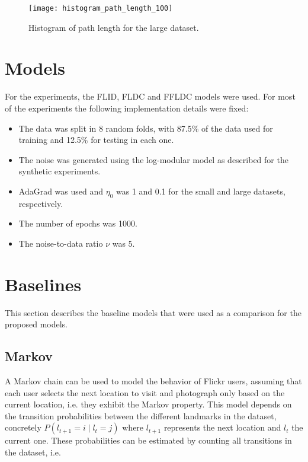 \begin{figure}
  \centering
  \texttt{[image: histogram\_path\_length\_100]}
  \caption{Histogram of path length for the large dataset.}
  \label{fig:histogram_path_length_100}
\end{figure}

\section{Models}

For the experiments, the FLID, FLDC and FFLDC models were used. For most of the experiments the following implementation details were fixed:

\begin{itemize}
  \item The data was split in 8 random folds, with 87.5\% of the data used for training and 12.5\% for testing in each one.
  \item The noise was generated using the log-modular model as described for the synthetic experiments.
  \item AdaGrad was used and $\eta_{0}$ was 1 and 0.1 for the small and large datasets, respectively.
  \item The number of epochs was 1000.
  \item The noise-to-data ratio $\nu$ was 5.
\end{itemize}

\section{Baselines}
\label{sec:baselines}

This section describes the baseline models that were used as a comparison for the proposed models.

\subsection{Markov}

A Markov chain can be used to model the behavior of Flickr users, assuming that each user selects the next location to visit and photograph only based on the current location, i.e. they exhibit the Markov property. This model depends on the transition probabilities between the different landmarks in the dataset, concretely $P(l_{t+1} = i \mid l_{t} = j)$ where $l_{t+1}$ represents the next location and $l_{t}$ the current one. These probabilities can be estimated by counting all transitions in the dataset, i.e.


